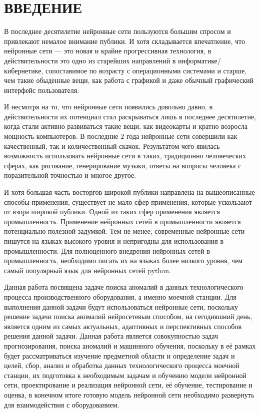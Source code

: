 \sectionbreak \section*{ 
    \gostTitleFont
    \redline
    ВВЕДЕНИЕ
}
\titlespace

{\gostFont

\par \redline 	В последнее десятилетие нейронные сети пользуются большим спросом и привлекают немалое внимание публики. И хотя складывается впечатление, что нейронные сети — это новая и крайне прогрессивная технология, в действительности это одно из старейших направлений в информатике/кибернетике, сопоставимое по возрасту с операционными системами и старше, чем такие обыденные вещи, как работа с графикой и даже обычный графический интерфейс пользователя.

\par \redline 	И несмотря на то, что нейронные сети появились довольно давно, в действительности их потенциал стал раскрываться лишь в последнее десятилетие, когда стали активно развиваться такие вещи, как видеокарты и кратно возросла мощность компьютеров. В последние 2 года нейронные сети совершили как качественный, так и количественный скачок. Результатом чего явилась возможность использовать нейронные сети в таких, традиционно человеческих сферах, как рисование, генерирование музыки, ответы на вопросы человека с поразительной точностью и многое другое. 


\par \redline И хотя большая часть восторгов широкой публики направлена на вышеописанные способы применения, существует не мало сфер применения, которые ускользают от взора широкой публики. Одной из таких сфер применения является промышленность. Применение нейронных сетей в промышленности является потенциально полезной задумкой. Тем не менее, современные нейронные сети пишутся на языках высокого уровня и непригодны для использования в промышленности. Для полноценного внедрения нейронных сетей в промышленность, необходимо писать их на языках более низкого уровня, чем самый популярный язык для нейронных сетей python.


\par \redline Данная работа посвящена задаче поиска аномалий в данных технологического процесса производственного оборудования, а именно моечной станции. Для выполнения данной задачи будут использоваться нейронные сети, поскольку решение задачи поиска аномалий нейросетевым способом, на сегодняшний день, является одним из самых актуальных, адаптивных и перспективных способов решения данной задачи. Данная работа является совокупностью задач прогнозирования, поиска аномалий и машинного обучения, поскольку в её рамках будет рассматриваться изучение предметной области и определение задач и целей, сбор, анализ и обработка данных технологического процесса моечной станции, их подготовка к необходимым задачам и обучению модели нейронной сети, проектирование и реализация нейронной сети, её обучение, тестирование и оценка, в конечном итоге готовую модель нейронной сети необходимо развернуть для взаимодействия с оборудованием.
\par
}
